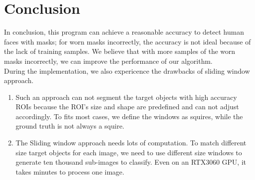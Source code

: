 \documentclass[10pt,a4paper]{report}
\begin{document}
\chapter{Conclusion}
In conclusion, this program can achieve a reasonable accuracy to detect human faces with masks; for worn masks incorrectly, the accuracy is not ideal because of the lack of training samples. We believe that with more samples of the worn masks incorrectly, we can improve the performance of our algorithm.  \\
During the implementation, we also expericence the drawbacks of sliding window approach.
\begin{enumerate}
\item Such an approach can not segment the target objects with high accuracy ROIs because the ROI's size and shape are predefined and can not adjust accordingly. To fits most cases, we define the windows as squires, while the ground truth is not always a squire.
\item The Sliding window approach needs lots of computation. To match different size target objects for each image, we need to use different size windows to generate ten thousand sub-images to classify. Even on an RTX3060 GPU, it takes minutes to process one image.

\end{enumerate}
\end{document}
